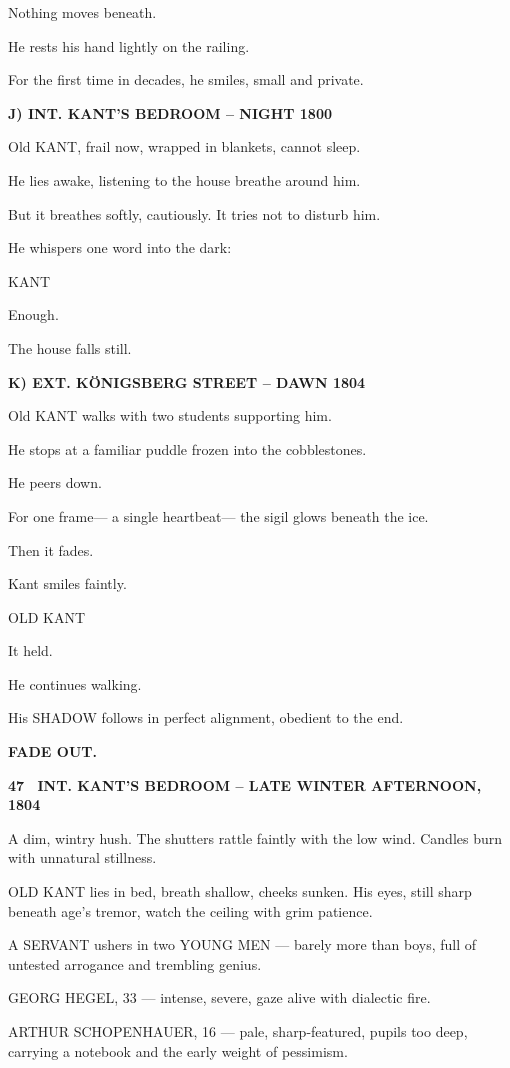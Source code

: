 \documentclass[12pt]{article}
\newcommand{\scene}[2]{%
  \vspace{1.8\baselineskip}%
  \noindent\textbf{#1 \ #2}\par\vspace{0.4\baselineskip}%
}
\newenvironment{dialogue}[1]{%
  \vspace{0.8\baselineskip}%
  \noindent\hspace*{2.3in}\textsc{#1}\par%
  \noindent\hspace*{1.5in}\begin{minipage}[t]{4.5in}%
}{%
  \end{minipage}\par%
}
\newcommand{\transition}[1]{%
  \vspace{0.6\baselineskip}%
  \begin{flushright}\textbf{#1}\end{flushright}%
}
\begin{document}
Nothing moves beneath.

He rests his hand lightly on the railing.

For the first time in decades, he smiles,
small and private.

\textbf{J) INT. KANT’S BEDROOM -- NIGHT 1800}

Old KANT, frail now, wrapped in blankets, cannot sleep.

He lies awake, listening to the house breathe around him.

But it breathes softly, cautiously.
It tries not to disturb him.

He whispers one word into the dark:

\begin{dialogue}{KANT}
Enough.
\end{dialogue}

The house falls still.

\textbf{K) EXT. KÖNIGSBERG STREET -- DAWN 1804}

Old KANT walks with two students supporting him.

He stops at a familiar puddle frozen into the cobblestones.

He peers down.

For one frame—
a single heartbeat—
the sigil glows beneath the ice.

Then it fades.

Kant smiles faintly.

\begin{dialogue}{OLD KANT}
It held.
\end{dialogue}

He continues walking.

His SHADOW follows in perfect alignment,
obedient to the end.

\transition{FADE OUT.}

\scene{47}{INT. KANT'S BEDROOM -- LATE WINTER AFTERNOON, 1804}

A dim, wintry hush.
The shutters rattle faintly with the low wind.
Candles burn with unnatural stillness.

OLD KANT lies in bed, breath shallow, cheeks sunken.
His eyes, still sharp beneath age’s tremor, watch the ceiling with grim patience.

A SERVANT ushers in two YOUNG MEN — barely more than boys, full of untested arrogance and trembling genius.

GEORG HEGEL, 33 — intense, severe, gaze alive with dialectic fire.

ARTHUR SCHOPENHAUER, 16 — pale, sharp-featured, pupils too deep, carrying a notebook and the early weight of pessimism.
\end{document}
